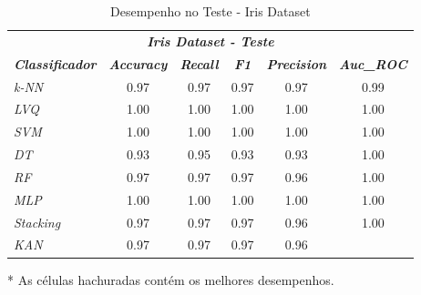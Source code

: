 \documentclass[journal]{IEEEtran}
\begin{document}
\begin{table}[h!]
	\caption{Desempenho no Teste - Iris Dataset}
	\label{tab:4}
	\begin{threeparttable}
		\begin{tabular}{lccccc}
			\hline
			\multicolumn{6}{c}{\textit{\textbf{Iris Dataset - Teste}}}                                                                                                                                           \\
			\multicolumn{1}{l|}{\textit{\textbf{Classificador}}} & \textit{\textbf{Accuracy}} & \textit{\textbf{Recall}}  & \textit{\textbf{F1}}      & \textit{\textbf{Precision}} & \textit{\textbf{Auc\_ROC}} \\ \hline
			\multicolumn{1}{l|}{\textit{k-NN}}                   & 0.97                       & 0.97                      & 0.97                      & 0.97                        & 0.99                       \\
			\multicolumn{1}{l|}{\textit{LVQ}}                    & \cellcolor{lightgray}1.00  & \cellcolor{lightgray}1.00 & \cellcolor{lightgray}1.00 & \cellcolor{lightgray}1.00   & \cellcolor{lightgray}1.00  \\
			\multicolumn{1}{l|}{\textit{SVM}}                    & \cellcolor{lightgray}1.00  & \cellcolor{lightgray}1.00 & \cellcolor{lightgray}1.00 & \cellcolor{lightgray}1.00   & \cellcolor{lightgray}1.00  \\
			\multicolumn{1}{l|}{\textit{DT}}                     & 0.93                       & 0.95                      & 0.93                      & 0.93                        & \cellcolor{lightgray}1.00  \\
			\multicolumn{1}{l|}{\textit{RF}}                     & 0.97                       & 0.97                      & 0.97                      & 0.96                        & \cellcolor{lightgray}1.00  \\
			\multicolumn{1}{l|}{\textit{MLP}}                    & \cellcolor{lightgray}1.00  & \cellcolor{lightgray}1.00 & \cellcolor{lightgray}1.00 & \cellcolor{lightgray}1.00   & \cellcolor{lightgray}1.00  \\
			\multicolumn{1}{l|}{\textit{Stacking}}               & 0.97                       & 0.97                      & 0.97                      & 0.96                        & \cellcolor{lightgray}1.00  \\
			\multicolumn{1}{l|}{\textit{KAN}}                    & 0.97                       & 0.97                      & 0.97                      & 0.96                        &                            \\
			\hline
		\end{tabular}
		\begin{tablenotes}\footnotesize
			\item[*] As células hachuradas contém os melhores desempenhos.
		\end{tablenotes}
	\end{threeparttable}
\end{table}
\end{document}
